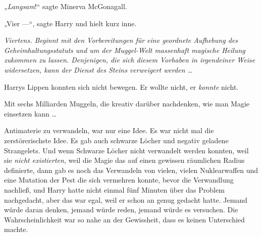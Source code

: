 \emph{„Langsam}!“ sagte Minerva McGonagall.

„Vier —“, sagte Harry und hielt kurz inne.

\emph{Viertens. Beginnt mit den Vorbereitungen für eine geordnete Aufhebung des Geheimhaltungsstatuts und um der Muggel-Welt massenhaft magische Heilung zukommen zu lassen. Denjenigen, die sich diesem Vorhaben in irgendeiner Weise widersetzen, kann der Dienst des Steins verweigert werden …}

Harrys Lippen konnten sich nicht bewegen. Er wollte nicht, er \emph{konnte} nicht.

Mit sechs Milliarden Muggeln, die kreativ darüber nachdenken, wie man Magie einsetzen kann …

Antimaterie zu verwandeln, war nur eine Idee. Es war nicht mal die zerstörerischste Idee. Es gab auch schwarze Löcher und negativ geladene Strangelets. Und wenn Schwarze Löcher nicht verwandelt werden konnten, weil sie \emph{nicht existierten}, weil die Magie das auf einen gewissen räumlichen Radius definierte, dann gab es noch das Verwandeln von vielen, vielen Nuklearwaffen und eine Mutation der Pest die sich vermehren konnte, bevor die Verwandlung nachließ, und Harry hatte nicht einmal fünf Minuten über das Problem nachgedacht, aber das war egal, weil er schon an genug gedacht hatte. Jemand würde daran denken, jemand würde reden, jemand würde es versuchen. Die Wahrscheinlichkeit war so nahe an der Gewissheit, dass es keinen Unterschied machte.

